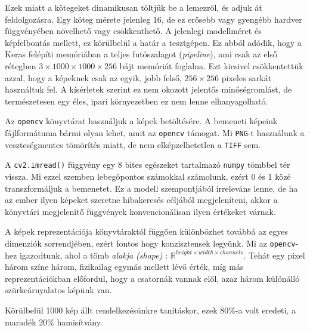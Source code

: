 Ezek miatt a kötegeket dinamikusan töltjük be a lemezről, és adjuk át feldolgozásra.
Egy köteg mérete jelenleg 16, de ez erősebb vagy gyengébb hardver függvényében 
növelhető vagy csökkenthető. A jelenlegi modellméret és képfelbontás mellett, ez 
körülbelül a határ a tesztgépen. Ez abból adódik, hogy a Keras felépíti memóriában 
a teljes futószalagot (\textit{pipeline}), ami csak az első rétegben
$ 3 \times 1000 \times 1000 \times 256 $ bájt memóriát foglalna.
Ezt kicsivel csökkentettük azzal, hogy a képeknek csak az egyik, jobb felső,
$ 256 \times 256 $ pixeles sarkát használtuk fel. A kísérletek szerint ez nem okozott
jelentős minőségromlást, de természetesen egy éles, ipari környezetben ez nem lenne
elhanyagolható.




Az \texttt{opencv} könyvtárat használjuk a képek betöltésére.
A bemeneti képeink fájlformátuma bármi olyan lehet, amit az \texttt{opencv} támogat.
Mi \texttt{PNG}-t használunk a veszteségmentes tömörítés miatt, de nem elképzelhetetlen
a \texttt{TIFF} sem.


A \texttt{cv2.imread()} függvény egy 8 bites egészeket
tartalmazó \texttt{numpy} tömbbel tér vissza. Mi ezzel szemben lebegőpontos számokkal számolunk,
ezért 0 és 1 közé transzformáljuk a bemenetet. Ez a modell szempontjából irreleváns lenne,
de ha az ember ilyen képeket szeretne hibakeresés céljából megjeleníteni, akkor a
könyvtári megjelenítő függvények konvencionálisan ilyen értékeket várnak.


A képek reprezentációja könyvtáraktól függően különbözhet továbbá az egyes dimenziók 
sorrendjében, ezért fontos hogy konzisztensek legyünk. Mi az \texttt{opencv}-hez
igazodtunk, ahol a tömb \textit{alakja (shape)} : 
$ \mathbb{R}^{height \times width \times channels } $. 
Tehát egy pixel három színe három, fizikailag egymás mellett lévő érték,
míg más reprezentációkban előfordul, hogy a csatornák vannak elől, azaz három különálló
szürkeárnyalatos képünk van.



Körülbelül 1000 kép állt rendelkezésünkre tanításkor, ezek 80\%-a volt
eredeti, a maradék 20\% hamisítvány. 


